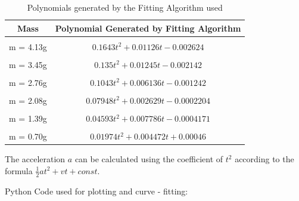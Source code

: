\documentclass{article}
\begin{document}
		\begin{table}[H]
			\centering
			\begin{tabular}{|c||c|}
				\hline
				Mass      & Polynomial Generated by Fitting Algorithm \\\hline\\
				m = 4.13g &  $0.1643 t^{2} + 0.01126 t - 0.002624$\\
				\hline\\
				m = 3.45g &  $0.135 t^{2} + 0.01245 t - 0.002142$\\
				\hline\\
				m = 2.76g &  $0.1043 t^{2} + 0.006136 t - 0.001242$\\
				\hline\\
				m = 2.08g & $0.07948 t^{2} + 0.002629 t - 0.0002204$\\
				\hline\\
				m = 1.39g &  $0.04593 t^{2} + 0.007786 t - 0.0004171$\\
				\hline\\
				m = 0.70g & $0.01974 t^{2} + 0.004472 t + 0.00046$\\ \hline                            
			\end{tabular}
		\caption{Polynomials generated by the Fitting Algorithm used}
		\label{table:ploy}
		\end{table}
	The acceleration $a$ can be calculated using the coefficient of $t^2$ according to the formula $\frac{1}{2}at^2 + vt + const.$
	
	\pagebreak
	
		Python Code used for plotting and curve - fitting: \\
		
\end{document}

